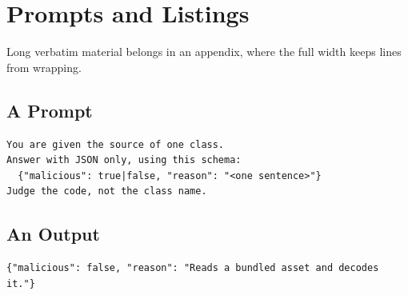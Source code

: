 \chapter{Prompts and Listings}
\label{app:second}

Long verbatim material belongs in an appendix, where the full width keeps lines
from wrapping.

\section{A Prompt}
\label{app:second-prompt}

\begin{lstlisting}[caption={[A verbatim prompt]A prompt, set verbatim so that every character is the one that was sent.}, label=lst:app-prompt]
You are given the source of one class.
Answer with JSON only, using this schema:
  {"malicious": true|false, "reason": "<one sentence>"}
Judge the code, not the class name.
\end{lstlisting}

\section{An Output}
\label{app:second-output}

\begin{lstlisting}[caption={[A verbatim output]The model's answer to the prompt of \Cref{lst:app-prompt}.}, label=lst:app-output]
{"malicious": false, "reason": "Reads a bundled asset and decodes it."}
\end{lstlisting}
